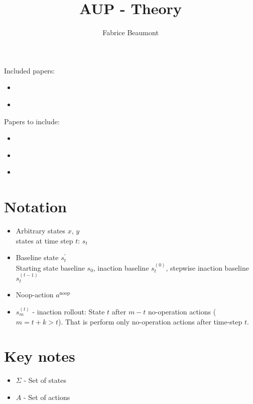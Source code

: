 



\title{AUP - Theory}
\author{Fabrice Beaumont}
\maketitle
\tableofcontents

Included papers:
\begin{itemize}
	\item \cite{2018_Krakovna_penaslizing}
	\item 	
\end{itemize}

Papers to include:
\begin{itemize}
	\item \cite{2018_Krakovna_measuring}
	\item \cite{2020_Turner_avoiding}
	\item \cite{2020_Turner_conservative}
\end{itemize}

\chapter{Notation}

\begin{itemize}
	\item Arbitrary states $x$, $y$\\
	states at time step $t$: $s_t$
	\item Baseline state $s^\prime_t$\\
	Starting state baseline $s_0$, inaction baseline $s_t^{(0)}$, stepwise inaction baseline $s_t^{(t-1)}$
	\item Noop-action $a^{\text{noop}}$	
	\item $s_{m}^{(t)}$ - inaction rollout: State $t$ after $m-t$ no-operation actions ($m=t+k>t$). That is perform only no-operation actions after time-step $t$.
\end{itemize}

\chapter{Key notes}

\begin{itemize}
	\item $\Sigma$ - Set of states
	\item $A$ - Set of actions
\end{itemize}

